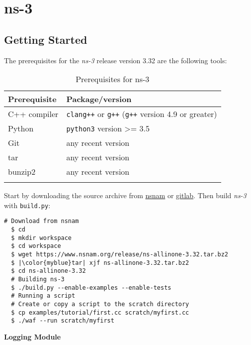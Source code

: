 \chapter{ns-3} 
\label{chap:ns3tuto}

\section{Getting Started}

The prerequisites for the \textit{ns-3} release version 3.32 are the following tools:

\begin{table}[h]
  \centering
  \begin{tabular}{@{}ll@{}}
  \toprule
  Prerequisite & Package/version                             \\ \midrule 
  C++ compiler & \texttt{clang++} or \texttt{g++} (\texttt{g++} version 4.9 or greater) \\
  Python       & \texttt{python3}  version \textgreater{}= 3.5         \\
  Git          & any recent version                          \\ 
  tar          & any recent version                          \\ 
  bunzip2      & any recent version                          \\ \bottomrule \\
  \end{tabular}
  \caption{Prerequisites for ns-3}
\end{table}

Start by downloading the source archive from \href{https://www.nsnam.org/release/ns-allinone-3.32.tar.bz2}{nsnam}
or \href{https://gitlab.com/nsnam/ns-3-allinone.git}{gitlab}. Then build \textit{ns-3} with \texttt{build.py}:

\begin{lstlisting}[language=myshell,caption={Download and installation of ns-3}, captionpos=b]
  # Download from nsnam
  $ cd
  $ mkdir workspace
  $ cd workspace
  $ wget https://www.nsnam.org/release/ns-allinone-3.32.tar.bz2
  $ |\color{myblue}tar| xjf ns-allinone-3.32.tar.bz2
  $ cd ns-allinone-3.32
  # Building ns-3
  $ ./build.py --enable-examples --enable-tests
  # Running a script
  # Create or copy a script to the scratch directory
  $ cp examples/tutorial/first.cc scratch/myfirst.cc
  $ ./waf --run scratch/myfirst
\end{lstlisting}

\textbf{Logging Module}

